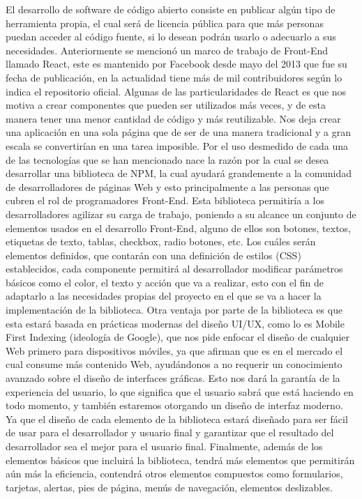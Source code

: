 El desarrollo de software de código abierto \cite{openSource} consiste en publicar algún tipo de herramienta propia, el cual será de licencia pública para que más personas puedan acceder al código fuente, si lo desean podrán usarlo o adecuarlo a sus necesidades. 
Anteriormente se mencionó un marco de trabajo de Front-End llamado React, este es mantenido por Facebook desde mayo del 2013 que fue su fecha de publicación, en la actualidad tiene más de mil contribuidores según lo indica el repositorio oficial. 
Algunas de las particularidades de React  \cite{reactOreilly}es que nos motiva a crear componentes que pueden ser utilizados más veces, y de esta manera tener una menor cantidad de código y más reutilizable. 
Nos deja crear una aplicación en una sola página que de ser de una manera tradicional y a gran escala se convertirían en una tarea imposible.
\newline
Por el uso desmedido de cada una de las tecnologías que se han mencionado nace la razón por la cual se desea desarrollar una biblioteca de NPM, la cual ayudará grandemente a la comunidad de desarrolladores de páginas Web y esto principalmente a las personas que cubren el rol de programadores Front-End. 
Esta biblioteca permitiría a los desarrolladores agilizar su carga de trabajo, poniendo a su alcance un conjunto de elementos usados en el desarrollo Front-End, alguno de ellos son botones, textos, etiquetas de texto, tablas, checkbox, radio botones, etc.  Los cuáles serán elementos definidos, que contarán con una definición de estilos \cite{scss} (CSS) establecidos, cada componente permitirá al desarrollador modificar parámetros básicos como el color, el texto y acción que va a realizar, esto con el fin de adaptarlo a las necesidades propias del proyecto en el que se va a hacer la implementación de la biblioteca.  
Otra ventaja por parte de la biblioteca es que esta estará basada en prácticas modernas del diseño UI/UX, como lo es Mobile First \cite{mobileFirst} Indexing (ideología de Google), que nos pide enfocar el diseño de cualquier Web primero para dispositivos móviles, ya que afirman que es en el mercado el cual consume más contenido Web, ayudándonos a no requerir un conocimiento avanzado sobre el diseño de interfaces gráficas. 
Esto nos dará la garantía de la experiencia del usuario, lo que significa que el usuario sabrá que está haciendo en todo momento, y también estaremos otorgando un diseño de interfaz moderno.
Ya que el diseño de cada elemento de la biblioteca estará diseñado para ser fácil de usar para el desarrollador y usuario final y garantizar que el resultado del desarrollador sea el mejor para el usuario final.
Finalmente, además de los elementos básicos que incluirá la biblioteca, tendrá más elementos que permitirán aún más la eficiencia, contendrá otros elementos compuestos como formularios, tarjetas, alertas, pies de página, menús de navegación, elementos deslizables. 

